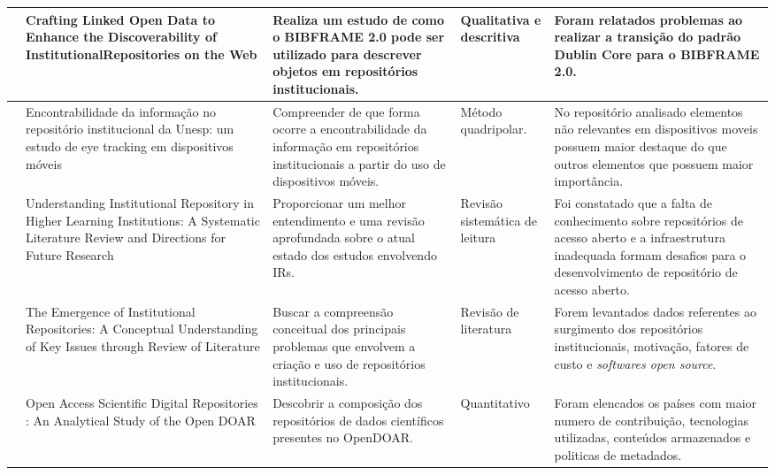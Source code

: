 \begin{landscape}
\begin{table}[H]
{\begin{tabular}{|p{5cm}|p{12cm}|p{12cm}|p{4cm}|p{13cm}|}
                \cite{2019:Jin}              & Crafting Linked Open Data to Enhance the Discoverability of InstitutionalRepositories on the Web                                          & Realiza um estudo de como o BIBFRAME 2.0 pode ser utilizado para descrever objetos em repositórios institucionais.                                          & Qualitativa e descritiva            & Foram relatados problemas ao realizar a transição do padrão Dublin Core para o BIBFRAME 2.0.                                                                                                 \\ \hline
                \cite{2019:FernandesMacedes} & Encontrabilidade da informação no repositório institucional da Unesp: um estudo de eye tracking em dispositivos móveis                    & Compreender de que forma ocorre a encontrabilidade da informação em repositórios institucionais a partir do uso de dispositivos móveis.                     & Método quadripolar.                 & No repositório analisado elementos não relevantes em dispositivos moveis possuem maior destaque do que outros elementos que possuem maior importância.                                       \\ \hline
                \cite{2019:Asadi}            & Understanding Institutional Repository in Higher Learning Institutions: A Systematic Literature Review and Directions for Future Research & Proporcionar um melhor entendimento e uma revisão aprofundada sobre o atual estado dos estudos envolvendo IRs.                                              & Revisão sistemática de leitura      & Foi constatado que a falta de conhecimento sobre repositórios de acesso aberto e a infraestrutura inadequada formam desafios para o desenvolvimento de repositório de acesso aberto.         \\ \hline
                \cite{2018:Saini}            & The Emergence of Institutional Repositories: A Conceptual Understanding of Key Issues through Review of Literature                        & Buscar a compreensão conceitual dos principais problemas que envolvem a criação e uso de repositórios institucionais.                                       & Revisão de literatura               & Forem levantados dados referentes ao surgimento dos repositórios institucionais, motivação, fatores de custo e \emph{softwares open source}.                                                 \\ \hline
                \cite{2018:Mufazil}          & Open Access Scientific Digital Repositories : An Analytical Study of the Open DOAR                                                        & Descobrir a composição dos repositórios de dados científicos presentes no OpenDOAR.                                                                         & Quantitativo                        & Foram elencados os países com maior numero de contribuição, tecnologias utilizadas, conteúdos armazenados e politicas de metadados.                                                          \\ \hline

\end{tabular}}
\end{table}
\end{landscape}
